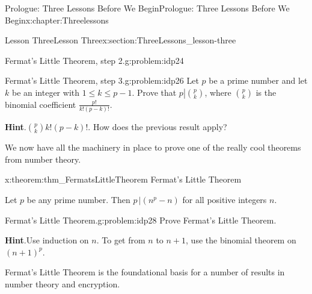 \begin{chapterptx}{Prologue: Three Lessons Before We Begin}{}{Prologue: Three Lessons Before We Begin}{}{}{x:chapter:Threelessons}
\begin{sectionptx}{Lesson Three}{}{Lesson Three}{}{}{x:section:ThreeLessons_lesson-three}
\begin{problem}{Fermat's Little Theorem, step 2.}{g:problem:idp24}
		\end{problem}
		\begin{problem}{Fermat's Little Theorem, step 3.}{g:problem:idp26}%
			 Let \(p\) be a prime number and let \(k\) be an integer with \(1\le k\le p-1\). Prove that \(p\left|{p \choose{}k}\right.\), where \({p \choose{}k}\) is the binomial coefficient \(\frac{p!}{k!(p-k)!}\).%
			\par\smallskip%
			\noindent\textbf{\blocktitlefont Hint}.\({p\choose{}k}k!(p-k)!\).  How does the previous result apply?%
		\end{problem}
		We now have all the machinery in place to prove one of the really cool theorems from number theory.%
		\begin{theorem}{}{}{x:theorem:thm_FermatsLittleTheorem}%
			\alert{Fermat's Little Theorem}%
			\par
			 Let \(p\) be any prime number. Then \(p\,|(n^p-n)\) for all positive integers \(n\).%
		\end{theorem}
		\begin{problem}{Fermat's Little Theorem.}{g:problem:idp28}%
			 Prove Fermat's Little Theorem.%
			\par\smallskip%
			\noindent\textbf{\blocktitlefont Hint}.\hypertarget{g:hint:idp29}{}\quad{}Use induction on \(n\). To get from \(n\) to \(n+1\), use the binomial theorem on \((n+1)^p\).%
		\end{problem}
		Fermat's Little Theorem is the foundational basis for a number of results in number theory and encryption.%
	\end{sectionptx}
\end{chapterptx}
%
%